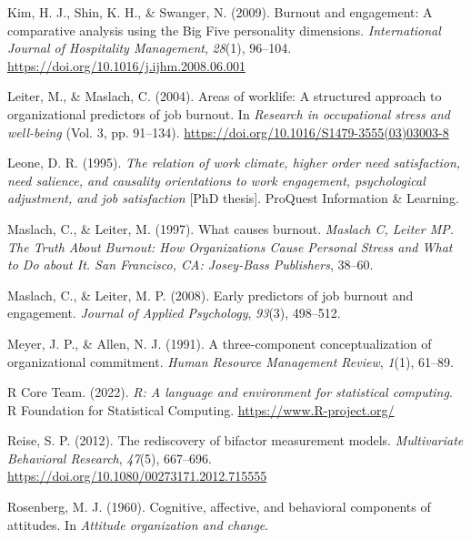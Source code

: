 \documentclass[
  man]{apa6}
\newlength{\cslhangindent}
\newlength{\cslentryspacingunit} %
\newenvironment{CSLReferences}[2] %
 {%
  \setlength{\parindent}{0pt}
  \ifodd #1
  \let\oldpar\par
  \def\par{\hangindent=\cslhangindent\oldpar}
  \fi
  \setlength{\parskip}{#2\cslentryspacingunit}
 }%
 {}
\begin{document}
\begin{CSLReferences}{1}{0}
\leavevmode{}%
Kim, H. J., Shin, K. H., \& Swanger, N. (2009). Burnout and engagement: {A} comparative analysis using the {Big} {Five} personality dimensions. \emph{International Journal of Hospitality Management}, \emph{28}(1), 96--104. \url{https://doi.org/10.1016/j.ijhm.2008.06.001}

\leavevmode{}%
Leiter, M., \& Maslach, C. (2004). Areas of worklife: A structured approach to organizational predictors of job burnout. In \emph{Research in occupational stress and well-being} (Vol. 3, pp. 91--134). \url{https://doi.org/10.1016/S1479-3555(03)03003-8}

\leavevmode{}%
Leone, D. R. (1995). \emph{The relation of work climate, higher order need satisfaction, need salience, and causality orientations to work engagement, psychological adjustment, and job satisfaction} {[}PhD thesis{]}. ProQuest Information \& Learning.

\leavevmode{}%
Maslach, C., \& Leiter, M. (1997). What causes burnout. \emph{Maslach C, Leiter MP. The Truth About Burnout: How Organizations Cause Personal Stress and What to Do about It. San Francisco, CA: Josey-Bass Publishers}, 38--60.

\leavevmode{}%
Maslach, C., \& Leiter, M. P. (2008). Early predictors of job burnout and engagement. \emph{Journal of Applied Psychology}, \emph{93}(3), 498--512.

\leavevmode{}%
Meyer, J. P., \& Allen, N. J. (1991). A three-component conceptualization of organizational commitment. \emph{Human Resource Management Review}, \emph{1}(1), 61--89.

\leavevmode{}%
R Core Team. (2022). \emph{R: A language and environment for statistical computing}. R Foundation for Statistical Computing. \url{https://www.R-project.org/}

\leavevmode{}%
Reise, S. P. (2012). The rediscovery of bifactor measurement models. \emph{Multivariate Behavioral Research}, \emph{47}(5), 667--696. \url{https://doi.org/10.1080/00273171.2012.715555}

\leavevmode{}%
Rosenberg, M. J. (1960). Cognitive, affective, and behavioral components of attitudes. In \emph{Attitude organization and change}.


\end{CSLReferences}
\end{document}

